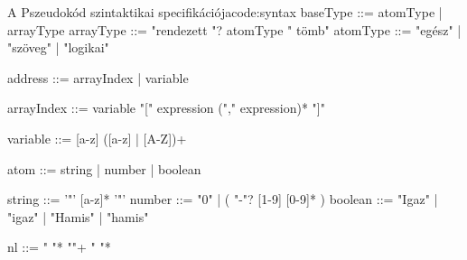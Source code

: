 \begin{code}{A Pszeudokód szintaktikai specifikációja}{code:syntax}
baseType ::= atomType | arrayType
arrayType ::= "rendezett "? atomType " tömb"
atomType ::= "egész" | "szöveg" | "logikai"


address ::= arrayIndex | variable

arrayIndex ::= variable "[" expression ("," expression)* "]"

variable ::= [a-z] ([a-z] | [A-Z])+

atom ::= string | number | boolean

string ::= '"' [a-z]* '"'
number ::= "0" | ( "-"? [1-9] [0-9]* )
boolean ::= "Igaz" | "igaz" | "Hamis" | "hamis"

nl ::= " "* "\n"+ " "*

\end{code}